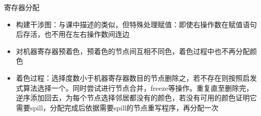 \documentclass{beamer}
\begin{document}
\begin{frame}{寄存器分配}
\begin{minipage}{0.75\linewidth}
  \begin{itemize}
    \item 构建干涉图：与课中描述的类似，但特殊处理赋值：即使右操作数在赋值语句后存活，也不用在左右操作数间连边
    \item 对机器寄存器预着色，预着色的节点间互相不同色，着色过程中也不再分配颜色
    \item 着色过程：选择度数小于机器寄存器数目的节点删除之，若不存在则按照启发式算法选择一个。同时尝试进行节点合并，freeze等操作。重复直至删除完，逆序添加回去，为每个节点选择邻居都没有的颜色，若没有可用的颜色证明它需要spill，分配完成后依据需要spill的节点重写程序，再分配一次
  \end{itemize}
\end{minipage}
\begin{minipage}{0.2\linewidth}
  \begin{figure}[htpb]
    \centering

\end{figure}
\end{minipage}
\end{frame}
\end{document}
